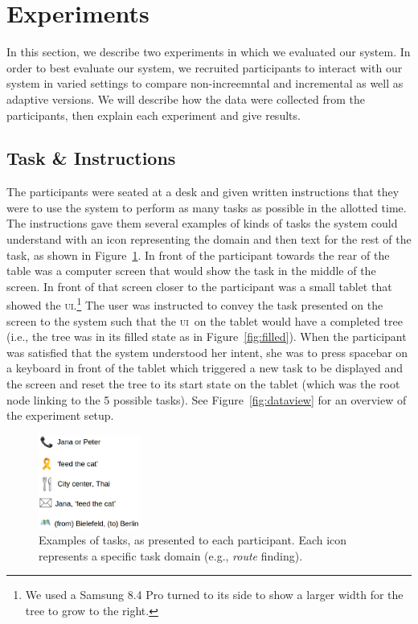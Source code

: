 \documentclass[11pt]{article}
\newcommand{\ui}[0]{\textsc{ui}}
\begin{document}
\section{Experiments}
\label{section:experiments}

In this section, we describe two experiments in which we evaluated our system. In order to best evaluate our system, we recruited participants to interact with our system in varied settings to compare non-increemntal and incremental as well as adaptive versions. We will describe how the data were collected from the participants, then explain each experiment and give results.

\subsection{Task \& Instructions} 
The participants were seated at a desk and given written instructions that they were to use the system to perform as many tasks as possible in the allotted time. The instructions gave them several examples of kinds of tasks the system could understand with an icon representing the domain and then text for the rest of the task, as shown in Figure~\ref{fig:taskex}. In front of the participant towards the rear of the table was a computer screen that would show the task in the middle of the screen. In front of that screen closer to the participant was a small tablet that showed the \ui.\footnote{We used a Samsung 8.4 Pro turned to its side to show a larger width for the tree to grow to the right.} The user was instructed to convey the task presented on the screen to the system such that the \ui\ on the tablet would have a completed tree (i.e., the tree was in its filled state as in Figure~\ref{fig:filled}). When the participant was satisfied that the system understood her intent, she was to press spacebar on a keyboard in front of the tablet which triggered a new task to be displayed and the screen and reset the tree to its start state on the tablet (which was the root node linking to the 5 possible tasks). See Figure~\ref{fig:dataview} for an overview of the experiment setup.

\begin{figure}
  \centering
      \includegraphics[width=0.3\textwidth]{figures/taskexample.png}	
      \caption{Examples of tasks, as presented to each participant. Each icon represents a specific task domain (e.g., \emph{route} finding).\label{fig:taskex}}
\end{figure}
\end{document}
